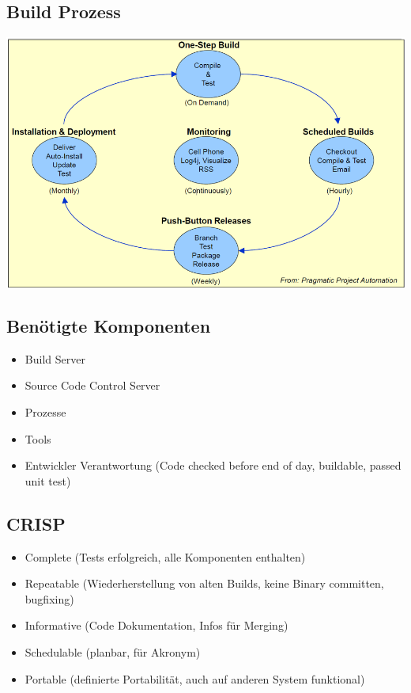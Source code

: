 \documentclass[10pt]{article}
\begin{document}
\subsection{Build Prozess}
\includegraphics{assets/buildprozess.png}

\subsection{Benötigte Komponenten}
\begin{itemize}
	\item Build Server
	\item Source Code Control Server
	\item Prozesse
	\item Tools
	\item Entwickler Verantwortung (Code checked before end of day, buildable, passed unit test)
\end{itemize}

\subsection{CRISP}
\begin{itemize}
	\item Complete (Tests erfolgreich, alle Komponenten enthalten)
	\item Repeatable (Wiederherstellung von alten Builds, keine Binary committen, bugfixing)
	\item Informative (Code Dokumentation, Infos für Merging)
	\item Schedulable (planbar, für Akronym)
	\item Portable (definierte Portabilität, auch auf anderen System funktional)
\end{itemize}
\end{document}

